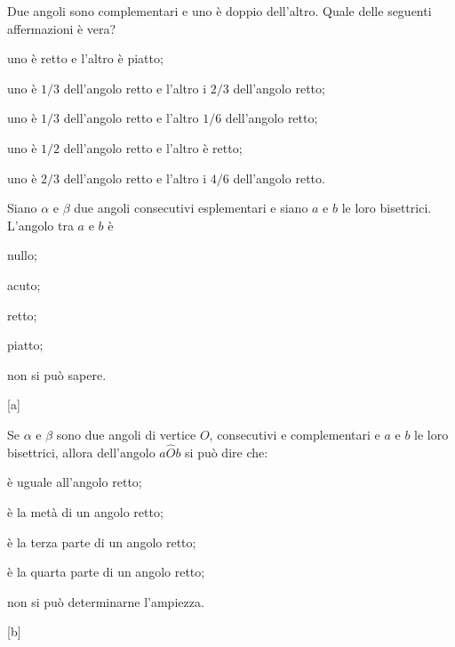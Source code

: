 \begin{esercizio}
\label{ese:1.66}
Due angoli sono complementari e uno è doppio dell'altro. Quale delle 
seguenti affermazioni è vera?
\vspace{-.5em}
\begin{enumeratea}
\item uno è retto e l'altro è piatto;
\item uno è \(1/3\) dell'angolo retto e l'altro i \(2/3\) dell'angolo 
retto;
\item uno è \(1/3\) dell'angolo retto e l'altro \(1/6\) dell'angolo retto;
\item uno è \(1/2\) dell'angolo retto e l'altro è retto;
\item uno è \(2/3\) dell'angolo retto e l'altro i \(4/6\) dell'angolo 
retto.
\end{enumeratea}
\end{esercizio}

\begin{esercizio}
\label{ese:1.67}
Siano \(\alpha\) e \(\beta\) due angoli consecutivi esplementari e siano 
\(a\) e \(b\) le loro bisettrici. L'angolo tra \(a\) e \(b\) è
\vspace{-.5em}
\begin{multicols}{3}
\begin{enumeratea}
\item nullo;
\item acuto;
\item retto;
\item piatto;
\item non si può sapere.
\end{enumeratea}
\end{multicols}
\vspace{-18pt}
\hfill[a]
\end{esercizio}

\begin{esercizio}
\label{ese:1.68}
Se \(\alpha\) e \(\beta\) sono due angoli di vertice \(O\), consecutivi e 
complementari e \(a\) e \(b\) le loro bisettrici, allora dell'angolo 
\(a\widehat{O}b\) si può dire  che:
\vspace{-.5em}
\begin{multicols}{2}
\begin{enumeratea}
\item è uguale all'angolo retto;
\item è la metà di un angolo retto;
\item è la terza parte di un angolo retto;
\item è la quarta parte di un angolo retto;
\item non si può determinarne l'ampiezza.
\end{enumeratea}
\end{multicols}
\vspace{-18pt}
\hfill[b]
\end{esercizio}

